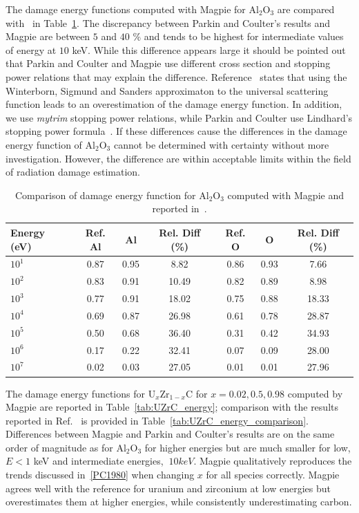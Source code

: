 \documentclass[review]{elsarticle}
\begin{document}
The damage energy functions computed with Magpie for  $\text{Al}_2\text{O}_3$ are compared with~\cite{PC1980} in Table~\ref{tab:Al2O3_energy}.
The discrepancy between Parkin and Coulter's results and Magpie are between $5$ and $40$ \% and tends to be highest for intermediate values of energy at $10$ keV. While this difference appears large it should be pointed out that Parkin and Coulter and Magpie use different cross section and stopping power relations that may explain the difference. Reference~\cite{PC1980} states that using the Winterborn, Sigmund and Sanders approximaton to the universal scattering function leads to an overestimation of the damage energy function. In addition, we use \textit{mytrim} stopping power relations, while Parkin and Coulter use Lindhard's stopping power formula~\cite{Lindhard1963}. If these differences cause the differences in the damage energy function of $\text{Al}_2\text{O}_3$ cannot be determined with certainty without more investigation. However, the difference are within acceptable limits within the field of radiation damage estimation. 

\begin{table}[p]
  \centering
  \caption{Comparison of damage energy function for  $\text{Al}_2\text{O}_3$ computed with Magpie and reported in~\cite{PC1980}. \label{tab:Al2O3_energy}}
\begin{tabular}{l*{6}{c}}
Energy (eV)              & Ref. Al & Al & Rel. Diff (\%) & Ref. O & O & Rel. Diff (\%) \\
\hline
   $10^1$ &     0.87 &     0.95 &     8.82 &     0.86 &     0.93 &     7.66 \\
  $10^2$ &     0.83 &     0.91 &    10.49 &     0.82 &     0.89 &     8.98 \\
 $10^3$ &     0.77 &     0.91 &    18.02 &     0.75 &     0.88 &    18.33 \\
 $10^4$ &     0.69 &     0.87 &    26.98 &     0.61 &     0.78 &    28.87 \\
$10^5$ &     0.50 &     0.68 &    36.40 &     0.31 &     0.42 &    34.93 \\
$10^6$ &     0.17 &     0.22 &    32.41 &     0.07 &     0.09 &    28.00 \\
$10^7$ &     0.02 &     0.03 &    27.05 &     0.01 &     0.01 &    27.96 \\
\hline
\end{tabular}
\end{table}

The damage energy functions for  $\text{U}_x\text{Zr}_{1-x}\text{C}$ for $x=0.02, 0.5, 0.98$ computed by Magpie are reported in Table~\ref{tab:UZrC_energy}; comparison with the results reported in
Ref.~\cite{PC1980} is provided in Table~\ref{tab:UZrC_energy_comparison}. Differences between Magpie and Parkin and Coulter's results are on the same order of magnitude as for $\text{Al}_2\text{O}_3$ for higher energies but are much smaller for low,  $E<1$ keV and intermediate energies, $~10keV$. Magpie qualitatively reproduces the trends discussed in~\ref{PC1980}
when changing $x$ for all species correctly. Magpie agrees well with the reference for uranium and zirconium at low energies but overestimates them at higher energies, while consistently underestimating carbon. 
\end{document}
